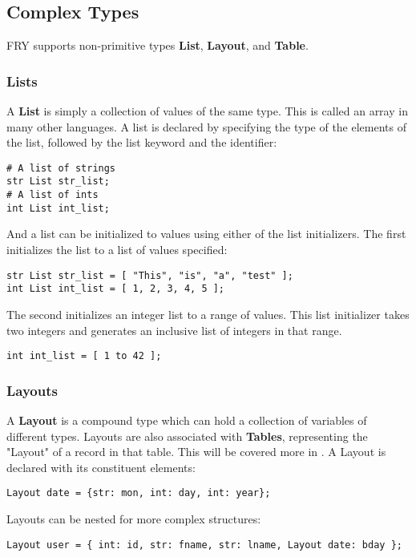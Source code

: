 \documentclass{article}
\begin{document}
\subsection{Complex Types}
FRY supports non-primitive types \textbf{List}, \textbf{Layout}, and \textbf{Table}. 
\subsubsection{Lists}
A \textbf{List} is simply a collection of values of the same type. This is called an array in many other languages. A list is declared by specifying the type of the elements of the list, followed by the list keyword and the identifier:

\begin{lstlisting}
# A list of strings
str List str_list;
# A list of ints
int List int_list;
\end{lstlisting}

And a list can be initialized to values using either of the list initializers. The first initializes the list to a list of values specified:

\begin{lstlisting}
str List str_list = [ "This", "is", "a", "test" ]; 
int List int_list = [ 1, 2, 3, 4, 5 ];
\end{lstlisting}

The second initializes an integer list to a range of values. This list initializer takes two integers and generates an inclusive list of integers in that range.

\begin{lstlisting}
int int_list = [ 1 to 42 ];
\end{lstlisting}

\subsubsection{Layouts}
A \textbf{Layout} is a compound type which can hold a collection of variables of different types. Layouts are also associated with \textbf{Tables}, representing the "Layout" of a record in that table. This will be covered more in \label{sec:Tables}.
A Layout is declared with its constituent elements:

\begin{lstlisting}
Layout date = {str: mon, int: day, int: year};
\end{lstlisting}

Layouts can be nested for more complex structures:
\begin{lstlisting}
Layout user = { int: id, str: fname, str: lname, Layout date: bday };
\end{lstlisting}
\end{document}
